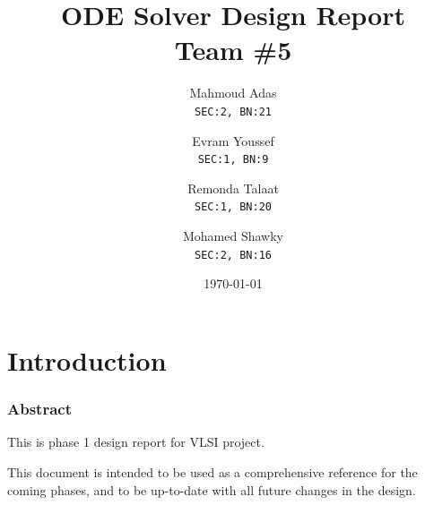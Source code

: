 \documentclass[12pt]{report}
\title{\textbf{ODE Solver Design Report}\\Team \#5}
\author{
  Mahmoud Adas\\
  \small\texttt{SEC:2, BN:21}
  \and
  Evram Youssef\\
  \small\texttt{SEC:1, BN:9}
  \and
  Remonda Talaat\\
  \small\texttt{SEC:1, BN:20}
  \and
  Mohamed Shawky\\
  \small\texttt{SEC:2, BN:16}
}
\date{\today}
\begin{document}
\thispagestyle{empty}

\maketitle
\tableofcontents
\listoffigures
\listoftables
\clearpage


\part{Introduction}
\section{Abstract}
This is phase 1 design report for VLSI project. 

This document is intended to be used as a comprehensive reference for the coming phases, and to be up-to-date with all future changes in the design.
\end{document}
